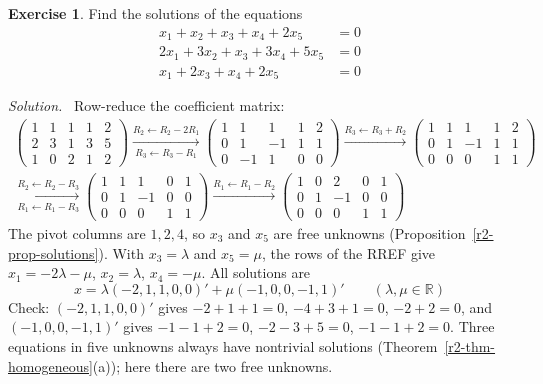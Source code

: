 \documentclass[12pt]{article}
\newcommand{\R}{\mathbb R}
\theoremstyle{definition}
\newtheorem{exercise}{Exercise}
\newenvironment{solution}{\par\noindent\textit{Solution.}\ }{\par\smallskip}
\begin{document}
\begin{exercise}\label{r2-ex-homogeneous-two}
Find the solutions of the equations
\[
\begin{aligned}
x_1+x_2+x_3+x_4+2x_5&=0\\
2x_1+3x_2+x_3+3x_4+5x_5&=0\\
x_1+2x_3+x_4+2x_5&=0
\end{aligned}
\]
\end{exercise}
\begin{solution}
Row-reduce the coefficient matrix:
\[
\begin{gathered}
\begin{pmatrix}1&1&1&1&2\\2&3&1&3&5\\1&0&2&1&2\end{pmatrix}
\xrightarrow[R_3\leftarrow R_3-R_1]{R_2\leftarrow R_2-2R_1}
\begin{pmatrix}1&1&1&1&2\\0&1&-1&1&1\\0&-1&1&0&0\end{pmatrix}
\xrightarrow{R_3\leftarrow R_3+R_2}
\begin{pmatrix}1&1&1&1&2\\0&1&-1&1&1\\0&0&0&1&1\end{pmatrix}
\\
\xrightarrow[R_1\leftarrow R_1-R_3]{R_2\leftarrow R_2-R_3}
\begin{pmatrix}1&1&1&0&1\\0&1&-1&0&0\\0&0&0&1&1\end{pmatrix}
\xrightarrow{R_1\leftarrow R_1-R_2}
\begin{pmatrix}1&0&2&0&1\\0&1&-1&0&0\\0&0&0&1&1\end{pmatrix}
\end{gathered}
\]
The pivot columns are \(1,2,4\), so \(x_3\) and \(x_5\) are free unknowns
(Proposition~\ref{r2-prop-solutions}). With \(x_3=\lambda\) and \(x_5=\mu\), the rows of the RREF
give \(x_1=-2\lambda-\mu\), \(x_2=\lambda\), \(x_4=-\mu\). All solutions are
\[
x=\lambda(-2,1,1,0,0)'+\mu(-1,0,0,-1,1)'\qquad(\lambda,\mu\in\R)
\]
Check: \((-2,1,1,0,0)'\) gives \(-2+1+1=0\), \(-4+3+1=0\), \(-2+2=0\), and \((-1,0,0,-1,1)'\)
gives \(-1-1+2=0\), \(-2-3+5=0\), \(-1-1+2=0\). Three equations in five unknowns always have
nontrivial solutions (Theorem~\ref{r2-thm-homogeneous}(a)); here there are two free unknowns.
\end{solution}
\end{document}

